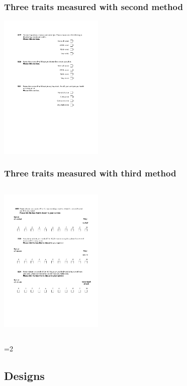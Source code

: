 \documentclass{beamer}
\begin{document}
\begin{frame}
	\frametitle{Three traits measured with second method}
		\includegraphics[height=7cm]{i/method-2.pdf}
\end{frame}

\begin{frame}
	\frametitle{Three traits measured with third method}
	\begin{columns}[T]
		\begin{column}{7cm}\includegraphics[height=7cm]{i/method-3.pdf}\end{column}
		\begin{column}{3cm}\hyperlink{model}{}\end{column}
	\end{columns}		
\end{frame}

=2
\subsection{Designs}
\end{document}
